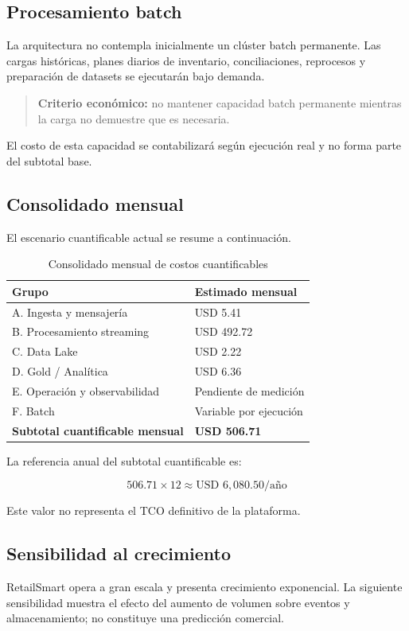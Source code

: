 \documentclass[11pt,a4paper]{article}
\begin{document}
\subsection{Procesamiento batch}
La arquitectura no contempla inicialmente un clúster batch permanente. Las cargas históricas, planes diarios de inventario, conciliaciones, reprocesos y preparación de datasets se ejecutarán bajo demanda.

\begin{quote}
\textbf{Criterio económico:} no mantener capacidad batch permanente mientras la carga no demuestre que es necesaria.
\end{quote}

El costo de esta capacidad se contabilizará según ejecución real y no forma parte del subtotal base.

\subsection{Consolidado mensual}
El escenario cuantificable actual se resume a continuación.

\begin{table}[H]
\caption{Consolidado mensual de costos cuantificables}\label{tab:consolidado-costos}
\small
\begin{tabularx}{\linewidth}{@{}XY@{}}\toprule
Grupo & Estimado mensual\\\midrule
A. Ingesta y mensajería & USD 5.41\\
B. Procesamiento streaming & USD 492.72\\
C. Data Lake & USD 2.22\\
D. Gold / Analítica & USD 6.36\\
E. Operación y observabilidad & Pendiente de medición\\
F. Batch & Variable por ejecución\\\midrule
\textbf{Subtotal cuantificable mensual} & \textbf{USD 506.71}\\\bottomrule
\end{tabularx}
\end{table}

La referencia anual del subtotal cuantificable es:

\[
506.71\times12 \approx \text{USD }6{,}080.50/\text{año}
\]

Este valor no representa el TCO definitivo de la plataforma.

\subsection{Sensibilidad al crecimiento}
RetailSmart opera a gran escala y presenta crecimiento exponencial. La siguiente sensibilidad muestra el efecto del aumento de volumen sobre eventos y almacenamiento; no constituye una predicción comercial.
\end{document}
